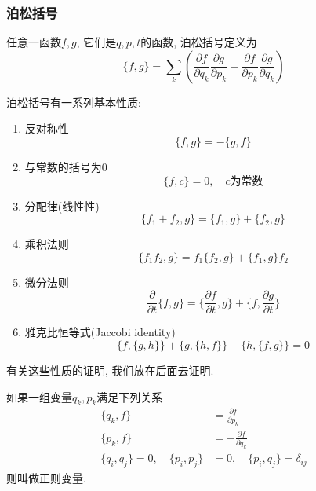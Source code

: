 \documentclass[a4paper,11pt]{article}
\theoremstyle{mystyle}
\begin{document}
\subsubsection{泊松括号}
\begin{definition}[泊松括号]
  任意一函数$f,g$, 它们是$q,p,t$的函数, 泊松括号定义为
  \begin{equation}\label{Poisson bracket}
    \{f,g\}=\sum_{k}\left(\frac{\partial f}{\partial{q_k}}\frac{\partial g}{\partial{p_k}}-\frac{\partial f}{\partial{p_k}}\frac{\partial g}{\partial{q_k}}\right)
  \end{equation}
\end{definition}
泊松括号有一系列基本性质:
\begin{enumerate}[(1)]
  \item\label{poisson 1} 反对称性
  \begin{equation*}
    \{f,g\}=-\{g,f\}
  \end{equation*}
  \item\label{poisson 2} 与常数的括号为$0$
  \begin{equation*}
    \{f,c\}=0,\quad\text{$c$为常数}
  \end{equation*}
  \item\label{poisson 3} 分配律(线性性)
  \begin{equation*}
    \{f_1+f_2,g\}=\{f_1,g\}+\{f_2,g\}
  \end{equation*}
  \item\label{poisson 4} 乘积法则
  \begin{equation*}
    \{f_1f_2,g\}=f_1\{f_2,g\}+\{f_1,g\}f_2
  \end{equation*}
  \item\label{poisson 5} 微分法则
  \begin{equation*}
    \frac{\partial}{\partial t}\{f,g\}=\{\frac{\partial f}{\partial t},g\}+\{f,\frac{\partial g}{\partial t}\}
  \end{equation*}
  \item\label{poisson 6} 雅克比恒等式(Jaccobi identity)
  \begin{equation*}
    \{f,\{g,h\}\}+\{g,\{h,f\}\}+\{h,\{f,g\}\}=0
  \end{equation*}
\end{enumerate}
有关这些性质的证明, 我们放在后面去证明.
\begin{definition}[正则变量]
  如果一组变量$q_k,p_k$满足下列关系
  \begin{equation*}
    \begin{split}
       \{q_k,f\} & =\frac{\partial f}{\partial{p_k}} \\
       \{p_k,f\} & =-\frac{\partial f}{\partial{q_k}} \\
       \{q_i,q_j\}=0,\quad \{p_i,p_j\}&=0,\quad \{p_i,q_j\}=\delta_{ij}
    \end{split}
  \end{equation*}
  则叫做正则变量.
\end{definition}
\end{document}

